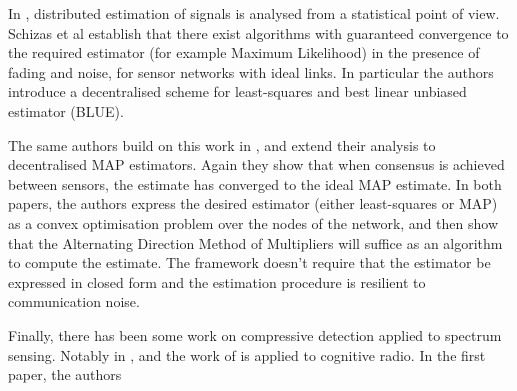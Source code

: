In \cite{schizas2008consensus}, distributed estimation of signals is analysed from a statistical point of view. Schizas et al establish that there exist algorithms with guaranteed convergence to the required estimator (for example Maximum Likelihood) in the presence of fading and noise, for sensor networks with ideal links. In particular the authors introduce a decentralised scheme for least-squares and best linear unbiased estimator (BLUE). 

The same authors build on this work in \cite{schizas2008consensus2}, and extend their analysis to decentralised MAP estimators. Again they show that when consensus is achieved between sensors, the estimate has converged to the ideal MAP estimate. In both papers, the authors express the desired estimator (either least-squares or MAP) as a convex optimisation problem over the nodes of the network, and then show that the Alternating Direction Method of Multipliers will suffice as an algorithm to compute the estimate. The framework doesn't require that the estimator be expressed in closed form and the estimation procedure is resilient to communication noise.

Finally, there has been some work on compressive detection applied to spectrum sensing. Notably in  \cite{verlant2012multiband}, and \cite{bodart2015multiband} the work of \cite{Davenport2010} is applied to cognitive radio. In the first paper, the authors